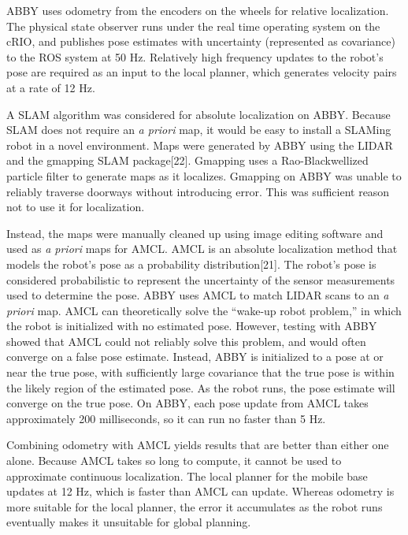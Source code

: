 \documentclass[]{cwru} %
\begin{document}
ABBY uses odometry from the encoders on the wheels for relative
localization. The physical state observer runs under the real time
operating system on the cRIO, and publishes pose estimates with
uncertainty (represented as covariance) to the ROS system at 50 Hz.
Relatively high frequency updates to the robot's pose are required as an
input to the local planner, which generates velocity pairs at a rate of
12 Hz.

A SLAM algorithm was considered for absolute localization on ABBY.
Because SLAM does not require an \emph{a priori} map, it would be easy
to install a SLAMing robot in a novel environment. Maps were generated
by ABBY using the LIDAR and the gmapping SLAM package{[}22{]}. Gmapping
uses a Rao-Blackwellized particle filter to generate maps as it
localizes. Gmapping on ABBY was unable to reliably traverse doorways
without introducing error. This was sufficient reason not to use it for
localization.

Instead, the maps were manually cleaned up using image editing software
and used as \emph{a priori} maps for AMCL. AMCL is an absolute
localization method that models the robot's pose as a probability
distribution{[}21{]}. The robot's pose is considered probabilistic to
represent the uncertainty of the sensor measurements used to determine
the pose. ABBY uses AMCL to match LIDAR scans to an \emph{a priori} map.
AMCL can theoretically solve the ``wake-up robot problem,'' in which the
robot is initialized with no estimated pose. However, testing with ABBY
showed that AMCL could not reliably solve this problem, and would often
converge on a false pose estimate. Instead, ABBY is initialized to a
pose at or near the true pose, with sufficiently large covariance that
the true pose is within the likely region of the estimated pose. As the
robot runs, the pose estimate will converge on the true pose. On ABBY,
each pose update from AMCL takes approximately 200 milliseconds, so it
can run no faster than 5 Hz.

Combining odometry with AMCL yields results that are better than either
one alone. Because AMCL takes so long to compute, it cannot be used to
approximate continuous localization. The local planner for the mobile
base updates at 12 Hz, which is faster than AMCL can update. Whereas
odometry is more suitable for the local planner, the error it
accumulates as the robot runs eventually makes it unsuitable for global
planning.
\end{document}
